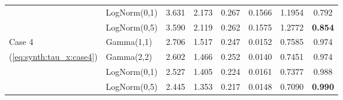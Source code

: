 \documentclass{amsart}
\begin{document}
\begin{table}[ht]
{\begin{tabular}{ll|cccccc}
		& LogNorm(0,1) & 3.631 & 2.173 & 0.267 & 0.1566 & 1.1954 & 0.792 \\ 
		& LogNorm(0,5) & 3.590 & 2.119 & 0.262 & 0.1575 & 1.2772 & \textbf{0.854} \\ 
		\midrule
		Case 4 & Gamma(1,1) & 2.706 & 1.517 & 0.247 & 0.0152 & 0.7585 & 0.974 \\ 
		(\cref{eq:synth:tau_x:case4}) & Gamma(2,2) & 2.602 & 1.466 & 0.252 & 0.0140 & 0.7451 & 0.974 \\ 
		& LogNorm(0,1) & 2.527 & 1.405 & 0.224 & 0.0161 & 0.7377 & 0.988 \\ 
		& LogNorm(0,5) & 2.445 & 1.353 & 0.217 & 0.0148 & 0.7090 & \textbf{0.990} \\ 
		\end{tabular}}
\end{table}




\end{document}
